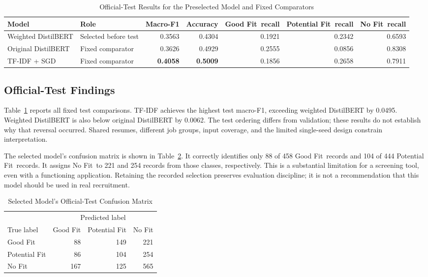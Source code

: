 \documentclass[conference,a4paper]{IEEEtran}
\newcommand{\GF}{Good Fit}
\newcommand{\PF}{Potential Fit}
\newcommand{\NF}{No Fit}
\begin{document}
\begin{table}[t]
\caption{Official-Test Results for the Preselected Model and Fixed Comparators}
\label{tab:test}
\centering\small
\begin{tabular}{llrrrrr}
\toprule
Model & Role & Macro-F1 & Accuracy & \GF\ recall & \PF\ recall & \NF\ recall\\
\midrule
Weighted DistilBERT & Selected before test & 0.3563 & 0.4304 & 0.1921 & 0.2342 & 0.6593\\
Original DistilBERT & Fixed comparator & 0.3626 & 0.4929 & 0.2555 & 0.0856 & 0.8308\\
TF-IDF + SGD & Fixed comparator & \textbf{0.4058} & \textbf{0.5009} & 0.1856 & 0.2658 & 0.7911\\
\bottomrule
\end{tabular}
\end{table}

\subsection{Official-Test Findings}
Table~\ref{tab:test} reports all fixed test comparisons. TF-IDF achieves the highest test macro-F1, exceeding weighted DistilBERT by 0.0495. Weighted DistilBERT is also below original DistilBERT by 0.0062. The test ordering differs from validation; these results do not establish why that reversal occurred. Shared resumes, different job groups, input coverage, and the limited single-seed design constrain interpretation.

The selected model's confusion matrix is shown in Table~\ref{tab:confusion}. It correctly identifies only 88 of 458 \GF\ records and 104 of 444 \PF\ records. It assigns \NF\ to 221 and 254 records from those classes, respectively. This is a substantial limitation for a screening tool, even with a functioning application. Retaining the recorded selection preserves evaluation discipline; it is not a recommendation that this model should be used in real recruitment.

\begin{table}[t]
\caption{Selected Model's Official-Test Confusion Matrix}
\label{tab:confusion}
\centering\footnotesize
\setlength{\tabcolsep}{4pt}
\begin{tabular}{lrrr}
\toprule
 & \multicolumn{3}{c}{Predicted label}\\
\cmidrule(lr){2-4}
True label & \GF & \PF & \NF\\
\midrule
\GF & 88 & 149 & 221\\
\PF & 86 & 104 & 254\\
\NF & 167 & 125 & 565\\
\bottomrule
\end{tabular}
\end{table}
\end{document}
